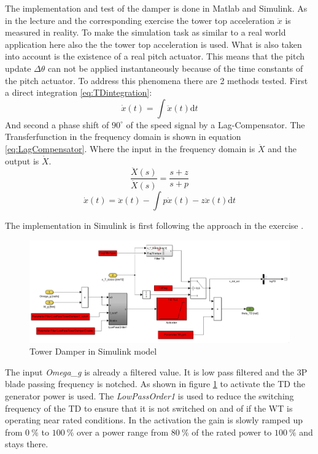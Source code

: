 The implementation and test of the damper is done in Matlab and Simulink. As in the lecture and the corresponding exercise \cite{2024} the tower top acceleration $\ddot{x}$ is measured in reality. To make the simulation task as similar to a real world application here also the the tower top acceleration is used. What is also taken into account is the existence of a real pitch actuator. This means that the pitch update $\Delta\theta$ can not be applied instantaneously because of the time constants of the pitch actuator. To address this phenomena there are 2 methods tested. First a direct integration \ref{eq:TDintegration}: 
\begin{equation}
	\dot{x}(t) = \int\ddot{x}(t) \text{d}t
	\label{eq:TDintegration}
\end{equation} 
And second a phase shift of $90^{\circ}$ of the speed signal by a Lag-Compensator. The Transferfunction in the frequency domain is shown in equation \ref{eq:LagCompensator}. Where the input in the frequency domain is $\ddot{X}$ and the output is $\dot{X}$. 
\begin{equation}
	\frac{\ddot{X}(s)}{\dot{X}(s)} = \frac{s + z}{s + p}
	\label{eq:LagCompensator}
\end{equation} 
\begin{equation}
	\dot{x}(t) = \ddot{x}(t) - \int p\dot{x}(t) - z\ddot{x}(t) \text{d}t
	\label{eq:xddTimeDomain}
\end{equation} 


The implementation in Simulink is first following the approach in the exercise \cite{2024}.
\begin{figure}[tbh]
	\centering	
	\includegraphics[width=12cm]{Figures/TDoverview}
	\caption{Tower Damper in Simulink model}
	\label{fig:TDoverview}
\end{figure}  
The input \textit{Omega\_g} is already a filtered value. It is low pass filtered and the 3P blade passing frequency is notched. As shown in figure \ref{fig:TDoverview} to activate the TD the generator power is used. The \textit{LowPassOrder1} is used to reduce the switching frequency of the TD to ensure that it is not switched on and of if the WT is operating near rated conditions. In the activation the gain is slowly ramped up from $\SI{0}{\%}$ to $\SI{100}{\%}$ over a power range from $\SI{80}{\%}$ of the rated power to $\SI{100}{\%}$ and stays there. 